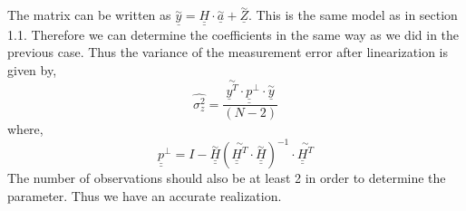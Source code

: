 \noindent The matrix can be written as $\underline{\overset{\sim}{y}} = \underline{\underline{H}} \cdot \underline{\overset{\sim}{a}} + \underline{\overset{\sim}{Z}}$.
\noindent This is the same model as in section 1.1. Therefore we can determine the coefficients in the same way as we did in the previous case. Thus the variance of the measurement error after linearization is given by,
$$\hat{\sigma_z^2} =\frac{\overset{\sim}{\underline{y}^T} \cdot \underline{\underline{p}}^{\bot}\cdot \underline{\overset{\sim}{y}}}{(N - 2)}$$
where,
$$\underline{\underline{p}}^{\bot} = I -  \overset{\sim}{\underline{\underline{H}}} (\overset{\sim}{\underline{\underline{H}}^T}   \cdot \overset{\sim}{\underline{\underline{H}}})^{-1}  \cdot  \overset{\sim}{\underline{\underline{H}}^T} $$
\noindent The number of observations should also be at least 2 in order to determine the parameter. Thus we have an accurate realization.\\



